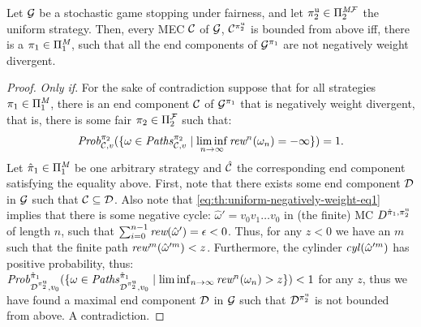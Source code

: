 \begin{theorem}\label{th:uniform-negatively-weight} Let $\mathcal{G}$ be a stochastic game stopping under fairness,  and let $\pi^{\mathrm{u}}_{2} \in \Pi^{\textit{M}\mathcal{F}}_{2}$ the uniform strategy. Then,
 every MEC $\mathcal{C}$ of $\mathcal{G}$, $\mathcal{C}^{\pi^{\mathrm{u}}_{2}}$ is bounded from above iff, there is a $\pi_{1} \in \Pi^{\textit{M}}_{1}$, such that all the end components
of $\mathcal{G}^{\pi_{1}}$ are not negatively weight divergent.
\end{theorem}
\begin{proof}  \emph{Only if}.  For the sake of contradiction suppose that for all   strategies $\pi_{1} \in \Pi^{\textit{M}}_{1}$,  there is an  end component $\mathcal{C}$ of $\mathcal{G}^{\pi_{1}}$ that  is  negatively weight divergent,
that is,  there is some fair $\pi_{2} \in \Pi^{\mathcal{F}}_{2}$ such that: 
\begin{equation}\label{eq:th:uniform-negatively-weight-eq1}
\mathit{Prob}^{\pi_{2}}_{\mathcal{C},v}(\{ \omega \in \mathit{Paths}^{\pi_{2}}_{\mathcal{C},v} \mid \liminf_{n \to \infty} \textit{rew}^n(\omega_n) = - \infty \}) = 1.
\end{equation} 
	Let $\hat{\pi}_{1} \in \Pi^{\textit{M}}_{1}$ be one arbitrary 	strategy and $\hat{\mathcal{C}}$ the corresponding end component satisfying the equality above.
	First, note that there exists some end component $\mathcal{D}$ in  $\mathcal{G}$ such that $\mathcal{C} \subseteq \mathcal{D}$.  Also note that \ref{eq:th:uniform-negatively-weight-eq1} implies
that there is some negative cycle: $\hat{\omega}' = v_0 v_1 \dots v_0$ in (the finite) MC $D^{\hat{\pi}_{1},\pi^{\mathrm{u}}_{2}}$ of length $n$, such that $\sum^{n-1}_{i=0} \textit{rew}(\hat{\omega}') = \epsilon <0$.  Thus, for any $z < 0$ we have an $m$ such that the  finite path $\textit{rew}^m(\hat{\omega}'^m) < z$. Furthermore, the cylinder $\mathit{cyl}(\hat{\omega}'^m)$ has positive probability,  thus:
$\mathit{Prob}^{\hat{\pi}_{1}}_{\mathcal{D}^{\pi^{\mathrm{u}}_{2}},v_0}(\{ \omega \in \mathit{Paths}^{\hat{\pi}_{1}}_{\mathcal{D}^{\pi^{\mathrm{u}}_{2}},v_0} \mid \liminf_{n \to \infty} \textit{rew}^n(\omega_n) > z \}) < 1$ for any $z$, thus we have found a maximal end component $\mathcal{D}$
in $\mathcal{G}$ such that $\mathcal{D}^{\pi^{\mathrm{u}}_{2}}$ is not bounded from above.  A contradiction. 


\end{proof}
